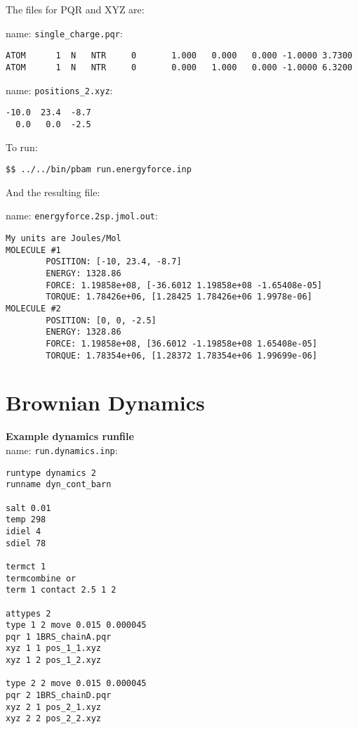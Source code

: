 The files for PQR and XYZ are: 

name:  \texttt{single\_charge.pqr}:
\begin{lstlisting}[style = MyBash]
ATOM      1  N   NTR     0       1.000   0.000   0.000 -1.0000 3.7300
ATOM      1  N   NTR     0       0.000   1.000   0.000 -1.0000 6.3200
\end{lstlisting}

\medskip

name:  \texttt{positions\_2.xyz}:
\begin{lstlisting}[style = MyBash]
-10.0  23.4  -8.7
  0.0   0.0  -2.5
\end{lstlisting}
\medskip

To run: 
\begin{lstlisting}[style = MyBash]
$$ ../../bin/pbam run.energyforce.inp
\end{lstlisting}
\medskip

And the resulting file: 

name: \texttt{energyforce.2sp.jmol.out}:
\begin{lstlisting}[style = MyBash]
My units are Joules/Mol
MOLECULE #1
        POSITION: [-10, 23.4, -8.7]
        ENERGY: 1328.86
        FORCE: 1.19858e+08, [-36.6012 1.19858e+08 -1.65408e-05]
        TORQUE: 1.78426e+06, [1.28425 1.78426e+06 1.9978e-06]
MOLECULE #2
        POSITION: [0, 0, -2.5]
        ENERGY: 1328.86
        FORCE: 1.19858e+08, [36.6012 -1.19858e+08 1.65408e-05]
        TORQUE: 1.78354e+06, [1.28372 1.78354e+06 1.99699e-06]
\end{lstlisting}


\section{Brownian Dynamics}

\textbf{Example dynamics runfile} \\

name:  \texttt{run.dynamics.inp}:
\begin{lstlisting}[style = MyBash]
runtype dynamics 2
runname dyn_cont_barn

salt 0.01
temp 298
idiel 4 
sdiel 78

termct 1
termcombine or
term 1 contact 2.5 1 2

attypes 2
type 1 2 move 0.015 0.000045
pqr 1 1BRS_chainA.pqr
xyz 1 1 pos_1_1.xyz
xyz 1 2 pos_1_2.xyz

type 2 2 move 0.015 0.000045
pqr 2 1BRS_chainD.pqr
xyz 2 1 pos_2_1.xyz
xyz 2 2 pos_2_2.xyz
\end{lstlisting}
\medskip

